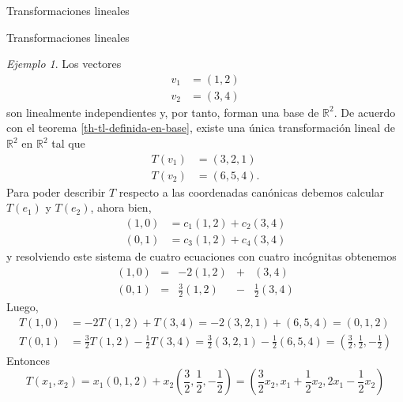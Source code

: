 \documentclass[a4paper,12pt,twoside,spanish,reqno]{amsbook}
\numberwithin{equation}{section}
\theoremstyle{definition}
\theoremstyle{remark}
\newtheorem*{ejemplo*}{Ejemplo}
\newcommand{\R}{\mathbb R}
\begin{document}
\begin{chapter}{Transformaciones lineales}
\begin{section}{Transformaciones lineales}
        \begin{ejemplo*}
            Los vectores
            \begin{align*}
                v_1 &= (1,2)\\
                v_2 &= (3,4)
            \end{align*}
            son linealmente independientes y, por tanto, forman una base de $\R^2$. De acuerdo con el teorema \ref{th-tl-definida-en-base}, existe una única transformación lineal de $\R^2$ en $\R^2$ tal que
            \begin{align*}
                T(v_1) &= (3,2, 1) \\
                T(v_2) &= (6, 5,4).
            \end{align*}
            Para poder describir $T$ respecto a las coordenadas canónicas debemos calcular $T(e_1)$ y $T(e_2)$,  ahora bien,
            \begin{align*}
            (1,0) &= c_{1}(1,2) + c_{2}(3,4)\\
            (0,1) &= c_{3}(1,2) + c_{4}(3,4)
            \end{align*}
            y resolviendo este sistema de cuatro ecuaciones con cuatro incógnitas obtenemos
            \begin{equation*}
            \begin{array}{rcrcr}
            (1,0) &=& -2(1,2) &+ &(3,4)\\
            (0,1) &=& \displaystyle\frac32(1,2) &- &\displaystyle\frac12(3,4)
            \end{array}
            \end{equation*}
            Luego, 
                \begin{align*}
            T(1,0) &= -2T(1,2)+ T(3,4) = -2(3,2, 1)+(6, 5,4) = (0,1,2)\\
            T(0,1) &= \displaystyle\frac32T(1,2) - \displaystyle\frac12T(3,4) = \displaystyle\frac32(3,2,1) - \displaystyle\frac12(6, 5,4)= (\displaystyle\frac32,\displaystyle\frac12,-\displaystyle\frac12)
            \end{align*}
            Entonces
                \begin{equation*}
            T(x_1,x_2) = x_1(0,1,2) + x_2		 (\displaystyle\frac32,\displaystyle\frac12,-\displaystyle\frac12)
            = (\displaystyle\frac32x_2,x_1+\displaystyle\frac12x_2,2x_1-\displaystyle\frac12x_2)
            \end{equation*}
        \end{ejemplo*}
        

\end{section}
\end{chapter}
\end{document}
